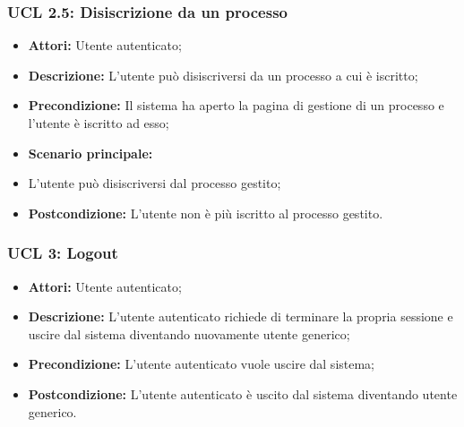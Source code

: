 \hypertarget{L2.5}{}
\subsubsection{UCL 2.5: Disiscrizione da un processo}
\begin{itemize}
\item \textbf{Attori:} Utente autenticato;
\item \textbf{Descrizione:} L'utente può disiscriversi da un processo a cui è iscritto;
\item \textbf{Precondizione:} Il sistema ha aperto la pagina di gestione di un processo e l'utente è iscritto ad esso;
\item \textbf{Scenario principale:}
\item L'utente può disiscriversi dal processo gestito;
\item \textbf{Postcondizione:} L'utente non è più iscritto al processo gestito.
\end{itemize}

\hypertarget{L3}{}
\subsubsection{UCL 3: Logout}
\begin{itemize}
	\item \textbf{Attori:} Utente autenticato;
	\item \textbf{Descrizione:} L'utente autenticato richiede di terminare la propria sessione e uscire dal sistema diventando nuovamente utente generico;
	\item \textbf{Precondizione:} L'utente autenticato vuole uscire dal sistema;
	\item \textbf{Postcondizione:} L'utente autenticato è uscito dal sistema diventando utente generico.
\end{itemize}